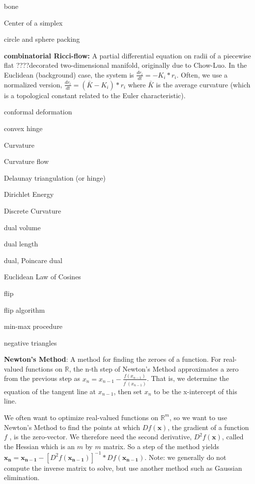 \documentclass{article}
\begin{document}
bone

Center of a simplex

circle and sphere packing \newline

\hangindent=1.0cm \textbf{combinatorial Ricci-flow:} A partial differential
equation on radii of a piecewise flat ????decorated two-dimensional
manifold, originally due to Chow-Luo. In the Euclidean (background) case,
the system is $\frac{dr_{i}}{dt}=-K_{i}\ast r_{i}$. Often, we use a
normalized version, $\frac{dr_{i}}{dt}=(\bar{K}-K_{i})\ast r_{i}$ where $%
\bar{K}$ is the average curvature (which is a topological constant related
to the Euler characteristic). \newline

conformal deformation

convex hinge

Curvature

Curvature flow

Delaunay triangulation (or hinge)

Dirichlet Energy

Discrete Curvature

dual volume

dual length

dual, Poincare dual

Euclidean Law of Cosines

flip

flip algorithm

min-max procedure

negative triangles

\hangindent=1.0cm \textbf{Newton's Method}: A method for finding the zeroes
of a function. For real-valued functions on $\mathbb{R}$, the n-th step of
Newton's Method approximates a zero from the previous step as $x_{n}=x_{n-1}-%
\frac{f(x_{n-1})}{f^{\prime }(x_{n-1})}$. That is, we determine the equation
of the tangent line at $x_{n-1}$, then set $x_{n}$ to be the x-intercept of
this line.\newline

 \hangindent=1.0cm \noindent We often want to optimize
real-valued functions on $\mathbb{R}^{m}$, so we want to use Newton's Method
to find the points at which $Df(\mathbf{x})$, the gradient of a function $f$%
, is the zero-vector. We therefore need the second derivative, $D^{2}f(%
\mathbf{x})$, called the Hessian which is an $m$ by $m$ matrix. So a step of
the method yields $\mathbf{x_{n}}=\mathbf{x_{n-1}}-[D^{2}f(\mathbf{x_{n-1}}%
)]^{-1}\ast Df(\mathbf{x_{n-1}})$. Note: we generally do not compute the
inverse matrix to solve, but use another method such as Gaussian elimination.%
\newline
\end{document}
